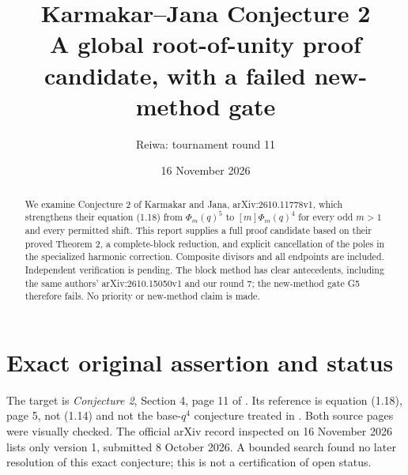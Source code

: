 \documentclass[11pt,a4paper]{article}
\title{Karmakar--Jana Conjecture 2\\[4pt]\large A global root-of-unity proof candidate, with a failed new-method gate}
\author{Reiwa: tournament round 11}
\date{16 November 2026}
\begin{document}
\maketitle
\begin{abstract}
We examine Conjecture 2 of Karmakar and Jana, arXiv:2610.11778v1,
which strengthens their equation (1.18) from $\Phi_m(q)^5$ to
$[m]\Phi_m(q)^4$ for every odd $m>1$ and every permitted shift.
This report supplies a full proof candidate based on their proved Theorem 2,
a complete-block reduction, and explicit cancellation of the poles in the
specialized harmonic correction. Composite divisors and all endpoints are
included. Independent verification is pending. The block method has clear
antecedents, including the same authors' arXiv:2610.15050v1 and our round 7;
the new-method gate G5 therefore fails. No priority or new-method claim is made.
\end{abstract}

\section{Exact original assertion and status}
The target is \emph{Conjecture 2}, Section 4, page 11 of \cite{KJ}.
Its reference is equation (1.18), page 5, not (1.14) and not the
base-$q^4$ conjecture treated in \cite{G2}. Both source pages were visually
checked. The official arXiv record inspected on 16 November 2026 lists
only version 1, submitted 8 October 2026. A bounded search found no later
resolution of this exact conjecture; this is not a certification of open status.
\end{document}

